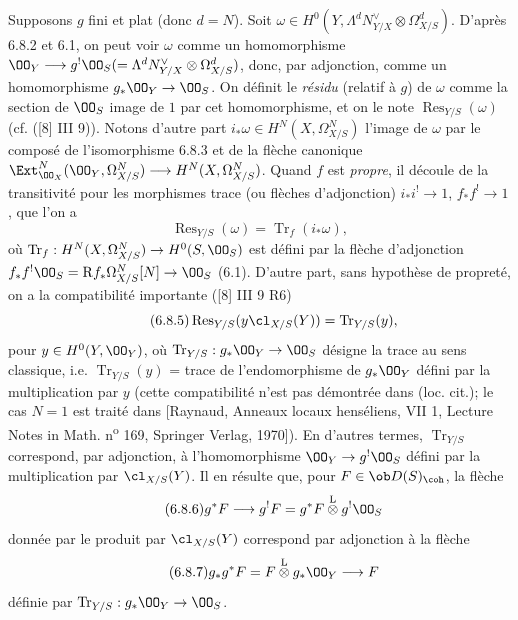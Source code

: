 Supposons $g$ fini et plat (donc $d=N$). Soit $\omega\in H^0(Y,\Lambda^d N_{Y/X}^{\vee}\otimes\Omega^d_{X/S})$. D'après 6.8.2 et 6.1, on peut voir $\omega$ comme un homomorphisme $\OO_Y\longrightarrow g^!\OO_S(=\Lambda^d N_{Y/X}^{\vee}\otimes\Omega^d_{X/S})$, donc, par adjonction, comme un homomorphisme $g_*\OO_Y\to\OO_S$. On définit le \emph{résidu} (relatif à $g$) de $\omega$ comme la section de $\OO_S$ image de $1$ par cet homomorphisme, et on le note $\operatorname{Res}_{Y/S}(\omega)$ (cf. ([8] III 9)). Notons d'autre part $i_*\omega\in H^N(X,\Omega^N_{X/S})$ l'image de $\omega$ par le composé de l'isomorphisme 6.8.3 et de la flèche canonique $\Ext^N_{\OO_X}(\OO_Y,\Omega^N_{X/S})\longrightarrow H^N(X,\Omega^N_{X/S})$. Quand $f$ est \emph{propre}, il découle de la transitivité pour les morphismes trace (ou flèches d'adjonction) $i_*i^!\to 1$, $f_*f^!\to 1$, que l'on a
\begin{equation}
\tag{6.8.4}
\operatorname{Res}_{Y/S}(\omega)=\operatorname{Tr}_f(i_*\omega),
\end{equation}
où $\operatorname{Tr}_f:H^N(X,\Omega^N_{X/S})\to H^0(S,\OO_S)$ est défini par la flèche d'adjonction $f_*f^!\OO_S=\mathrm{R} f_*\Omega^N_{X/S}[N]\to\OO_S$ (6.1). D'autre part, sans hypothèse de propreté, on a la compatibilité importante ([8] III 9 R6)
\begin{equation}
\tag{6.8.5}
\operatorname{Res}_{Y/S}(y\cl_{X/S}(Y))=\operatorname{Tr}_{Y/S}(y),
\end{equation}
pour $y\in H^0(Y,\OO_Y)$, où $\operatorname{Tr}_{Y/S}:g_*\OO_Y\to\OO_S$ désigne la trace au sens classique, i.e. $\operatorname{Tr}_{Y/S}(y)$ = trace de l'endomorphisme de $g_*\OO_Y$ défini par la multiplication par $y$ (cette compatibilité n'est pas démontrée dans (loc. cit.); le cas $N=1$ est traité dans [Raynaud, Anneaux locaux henséliens, VII 1, Lecture Notes in Math. n\textsuperscript{o} 169, Springer Verlag, 1970]). En d'autres termes, $\operatorname{Tr}_{Y/S}$ correspond, par adjonction, à l'homomorphisme $\OO_Y\to g^!\OO_S$ défini par la multiplication par $\cl_{X/S}(Y)$. Il en résulte que, pour $F\in\ob D(S)_{\coh}$, la flèche
\begin{equation}
\tag{6.8.6}
g^*F\longrightarrow g^!F=g^*F\overset{\mathrm{L}}{\otimes}g^!\OO_S
\end{equation}
donnée par le produit par $\cl_{X/S}(Y)$ correspond par adjonction à la flèche
\begin{equation}
\tag{6.8.7}
g_*g^*F=F\overset{\mathrm{L}}{\otimes}g_*\OO_Y\longrightarrow F
\end{equation}
définie par $\operatorname{Tr}_{Y/S}:g_*\OO_Y\to\OO_S$.


